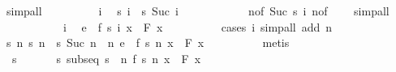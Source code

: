 \documentclass[leqno]{article}
\theoremstyle{definition}
\begin{document}
\begin{isabellebody}
\ simp{\isacharunderscore}all\isanewline
\ \ \ \ \ \ \isacommand{{\isacharbraceleft}}\isamarkupfalse%
\ \isamarkupfalse%
\ i\ \isamarkupfalse%
\ {\isachardoublequoteopen}s\ i\ {\isacharless}\ s\ {\isacharparenleft}Suc\ i{\isacharparenright}{\isachardoublequoteclose}\isanewline
\ \ \ \ \ \ \ \ \ \ \isamarkupfalse%
\ n{\isacharparenleft}{}{\isacharparenright}{\isacharbrackleft}of\ {\isachardoublequoteopen}Suc\ {\isacharparenleft}s\ i{\isacharparenright}{\isachardoublequoteclose}{\isacharbrackright}\ n{\isacharparenleft}{}{\isacharparenright}{\isacharbrackleft}of\ {}{\isacharbrackright}\ \ \isamarkupfalse%
\ simp{\isacharunderscore}all\ \isacommand{{\isacharbraceright}}\isamarkupfalse%
\isanewline
\ \ \ \ \ \ \isamarkupfalse%
\ \isacommand{{\isacharbraceleft}}\isamarkupfalse%
\ \isamarkupfalse%
\ i\ \isamarkupfalse%
\ {\isachardoublequoteopen}e\ {\isasymle}\ {\isasymbar}f\ {\isacharparenleft}s\ i{\isacharparenright}\ x\ {\isacharminus}\ F\ x{\isasymbar}{\isachardoublequoteclose}\isanewline
\ \ \ \ \ \ \ \ \isamarkupfalse%
\ {\isacharparenleft}cases\ i{\isacharparenright}\ {\isacharparenleft}simp{\isacharunderscore}all\ add{\isacharcolon}\ n{\isacharparenright}\ \isacommand{{\isacharbraceright}}\isamarkupfalse%
\isanewline
\ \ \ \ \ \ \isamarkupfalse%
\ \isamarkupfalse%
\ {\isachardoublequoteopen}{\isasymexists}s{\isachardot}\ {\isacharparenleft}{\isasymforall}n{\isachardot}\ s\ n\ {\isacharless}\ s\ {\isacharparenleft}Suc\ n{\isacharparenright}{\isacharparenright}\ {\isasymand}\ {\isacharparenleft}{\isasymforall}n{\isachardot}\ e\ {\isasymle}\ {\isasymbar}f\ {\isacharparenleft}s\ n{\isacharparenright}\ x\ {\isacharminus}\ F\ x{\isasymbar}{\isacharparenright}{\isachardoublequoteclose}\isanewline
\ \ \ \ \ \ \ \ \isamarkupfalse%
\ metis\isanewline
\ \ \ \ \isamarkupfalse%
\isanewline
\ \ \isamarkupfalse%
\ \isamarkupfalse%
\ {\isasymepsilon}\ s\ \ {\isasymepsilon}{\isacharcolon}\ {\isachardoublequoteopen}{\isasymepsilon}\ {\isachargreater}\ {}{\isachardoublequoteclose}\ \ s{\isacharcolon}\ {\isachardoublequoteopen}subseq\ s\ {\isasymand}\ {\isacharparenleft}{\isasymforall}n{\isachardot}\ {\isasymbar}f\ {\isacharparenleft}s\ n{\isacharparenright}\ x\ {\isacharminus}\ F\ x{\isasymbar}\ {\isasymge}\ {\isasymepsilon}{\isacharparenright}{\isachardoublequoteclose}\ \isamarkupfalse%

\end{isabellebody}
\end{document}
